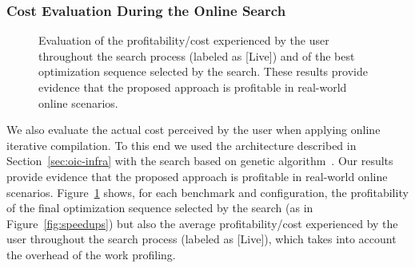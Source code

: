 \subsubsection{Cost Evaluation During the Online Search}

\begin{figure}[t]
  \centering
  \caption{Evaluation of the profitability/cost experienced by the user throughout the search process (labeled as [Live]) and of the best optimization sequence selected by the search. These results provide evidence that the proposed approach is profitable in real-world online scenarios.}
  \label{fig:deployment_cost}
\end{figure}

We also evaluate the actual cost perceived by the user when applying online iterative compilation.
To this end we used the architecture described in Section~\ref{sec:oic-infra} with the search based on genetic algorithm~\cite{knijnenburg02,cooper99,kulkarni04}.
Our results provide evidence that the proposed approach is profitable in real-world online scenarios.
Figure~\ref{fig:deployment_cost} shows, for each benchmark and configuration, the profitability of the final optimization sequence
selected by the search (as in Figure~\ref{fig:speedups}) but also the average profitability/cost experienced by the user throughout the search process (labeled as [Live]),
which takes into account the overhead of the work profiling.

